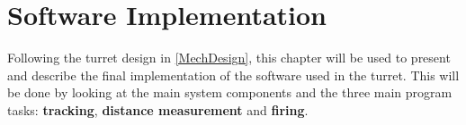 \chapter{Software Implementation}\label{ImplLabel}
Following the turret design in \autoref{MechDesign}, this chapter will be used
to present and describe the final implementation of the software used in the \name turret. This will be done
by looking at the main system components and the three main program tasks:
\textbf{tracking}, \textbf{distance measurement} and \textbf{firing}.


%






% 
